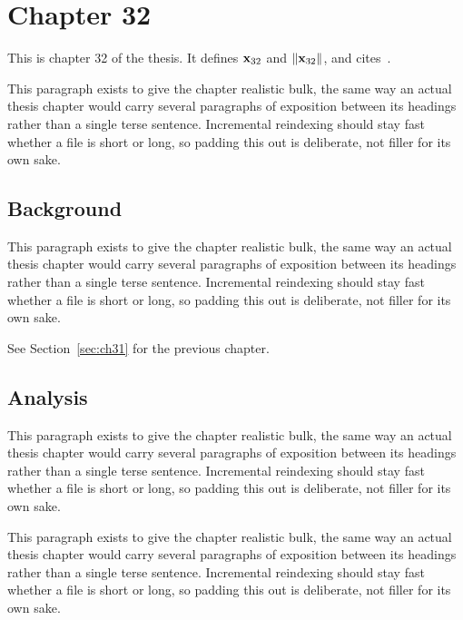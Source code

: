 \section{Chapter 32}
\label{sec:ch32}

This is chapter 32 of the thesis. It defines $\mathbf{x}_{32}$ and $\lVert \mathbf{x}_{32} \rVert$, and cites~\cite{ref1}.

This paragraph exists to give the chapter realistic bulk, the same way an actual thesis chapter would carry several paragraphs of exposition between its headings rather than a single terse sentence. Incremental reindexing should stay fast whether a file is short or long, so padding this out is deliberate, not filler for its own sake.

\subsection{Background}
\label{sec:ch32:background}

This paragraph exists to give the chapter realistic bulk, the same way an actual thesis chapter would carry several paragraphs of exposition between its headings rather than a single terse sentence. Incremental reindexing should stay fast whether a file is short or long, so padding this out is deliberate, not filler for its own sake.

See Section~\ref{sec:ch31} for the previous chapter.

\subsection{Analysis}
\label{sec:ch32:analysis}

This paragraph exists to give the chapter realistic bulk, the same way an actual thesis chapter would carry several paragraphs of exposition between its headings rather than a single terse sentence. Incremental reindexing should stay fast whether a file is short or long, so padding this out is deliberate, not filler for its own sake.

This paragraph exists to give the chapter realistic bulk, the same way an actual thesis chapter would carry several paragraphs of exposition between its headings rather than a single terse sentence. Incremental reindexing should stay fast whether a file is short or long, so padding this out is deliberate, not filler for its own sake.
